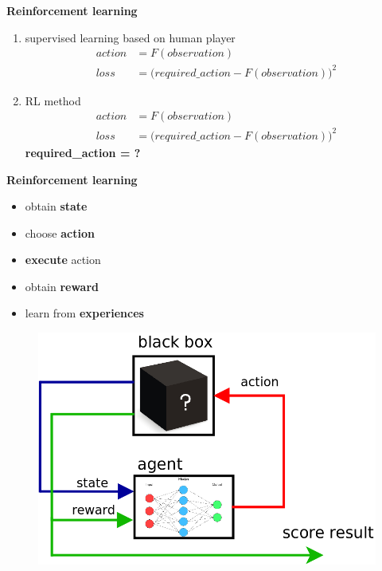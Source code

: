 \documentclass[xcolor=dvipsnames]{beamer}
\begin{document}
\begin{frame}{\bf Reinforcement learning}


\begin{enumerate}
 \item supervised learning based on human player \\
             \begin{align*}
               action &= F(observation) \\
               loss   &= \Big(required\_action - F(observation)\Big)^2
             \end{align*}
 \item RL method \\
             \begin{align*}
               action &= F(observation) \\
               loss   &= \Big(required\_action - F(observation)\Big)^2
             \end{align*}
             {\bf \color{red} required\_action = ?}
\end{enumerate}

\end{frame}


\begin{frame}{\bf Reinforcement learning}

\begin{itemize}
  \item obtain {\bf state}
  \item choose {\bf action}
  \item {\bf execute} action
  \item obtain {\bf reward}
  \item learn from {\bf experiences}
\end{itemize}

  \begin{figure}
    \includegraphics[scale=0.3]{../../diagrams/rl_mechanism.png}
  \end{figure}

\end{frame}
\end{document}
